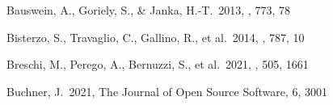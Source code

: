 \documentclass[twocolumn,twocolappendix]{aastex63}
\begin{document}
\begin{thebibliography}{}


















 Bauswein, A., Goriely, S., \& Janka, H.-T.\ 2013, \apj, 773, 78






 Bisterzo, S., Travaglio, C., Gallino, R., et al.\ 2014, \apj, 787, 10




 Breschi, M., Perego, A., Bernuzzi, S., et al.\ 2021, \mnras, 505, 1661

 Buchner, J.\ 2021, The Journal of Open Source Software, 6, 3001



\end{thebibliography}
\end{document}
